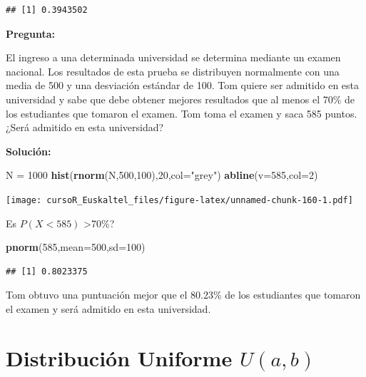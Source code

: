 \documentclass[]{book}
\newenvironment{Shaded}{\begin{snugshade}}{\end{snugshade}}
\newcommand{\KeywordTok}[1]{\textcolor[rgb]{0.13,0.29,0.53}{\textbf{#1}}}
\newcommand{\DataTypeTok}[1]{\textcolor[rgb]{0.13,0.29,0.53}{#1}}
\newcommand{\DecValTok}[1]{\textcolor[rgb]{0.00,0.00,0.81}{#1}}
\newcommand{\StringTok}[1]{\textcolor[rgb]{0.31,0.60,0.02}{#1}}
\newcommand{\NormalTok}[1]{#1}
\begin{document}
\begin{verbatim}
## [1] 0.3943502
\end{verbatim}

\textbf{Pregunta:}

El ingreso a una determinada universidad se determina mediante un examen
nacional. Los resultados de esta prueba se distribuyen normalmente con
una media de 500 y una desviación estándar de 100. Tom quiere ser
admitido en esta universidad y sabe que debe obtener mejores resultados
que al menos el 70\% de los estudiantes que tomaron el examen. Tom toma
el examen y saca 585 puntos. ¿Será admitido en esta universidad?

\textbf{Solución:}

\begin{Shaded}
\begin{Highlighting}[]
\NormalTok{N =}\StringTok{ }\DecValTok{1000}
\KeywordTok{hist}\NormalTok{(}\KeywordTok{rnorm}\NormalTok{(N,}\DecValTok{500}\NormalTok{,}\DecValTok{100}\NormalTok{),}\DecValTok{20}\NormalTok{,}\DataTypeTok{col=}\StringTok{"grey"}\NormalTok{)}
\KeywordTok{abline}\NormalTok{(}\DataTypeTok{v=}\DecValTok{585}\NormalTok{,}\DataTypeTok{col=}\DecValTok{2}\NormalTok{)}
\end{Highlighting}
\end{Shaded}

\texttt{[image: cursoR\_Euskaltel\_files/figure-latex/unnamed-chunk-160-1.pdf]}

Es \(P(X<585)\) \textgreater{}70\%?

\begin{Shaded}
\begin{Highlighting}[]
\KeywordTok{pnorm}\NormalTok{(}\DecValTok{585}\NormalTok{,}\DataTypeTok{mean=}\DecValTok{500}\NormalTok{,}\DataTypeTok{sd=}\DecValTok{100}\NormalTok{)}
\end{Highlighting}
\end{Shaded}

\begin{verbatim}
## [1] 0.8023375
\end{verbatim}

Tom obtuvo una puntuación mejor que el 80.23\% de los estudiantes que
tomaron el examen y será admitido en esta universidad.

\section{\texorpdfstring{Distribución Uniforme
\(U(a,b)\)}{Distribución Uniforme U(a,b)}}\label{distribucion-uniforme-uab}
\end{document}
